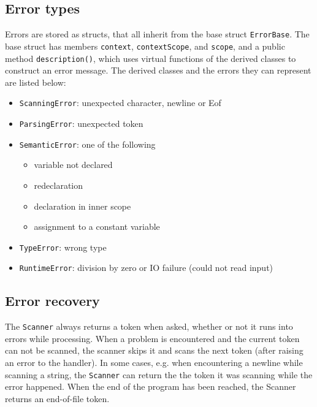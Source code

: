 \documentclass[a4paper]{article}
\newcommand*{\code}[1]{\texttt{#1}}
\begin{document}
\subsection{Error types}

Errors are stored as structs, that all inherit from the 
base struct \code{ErrorBase}. The base struct has members 
\code{context}, \code{contextScope}, and \code{scope}, 
and a public method \code{description()}, which uses 
virtual functions of the derived classes to construct an 
error message. The derived classes and the errors they 
can represent are listed below:
\begin{itemize}
  \item \code{ScanningError}: unexpected character, newline or Eof
  \item \code{ParsingError}: unexpected token
  \item \code{SemanticError}: one of the following
  \begin{itemize}
    \item variable not declared
    \item redeclaration
    \item declaration in inner scope
    \item assignment to a constant variable
  \end{itemize}
  \item \code{TypeError}: wrong type
  \item \code{RuntimeError}: division by zero or IO failure (could not read input)
\end{itemize}


\subsection{Error recovery}

The \code{Scanner} always returns a token when asked, whether or 
not it runs into errors while processing. When a problem is 
encountered and the current token can not be scanned, the scanner 
skips it and scans the next token (after raising an error to the 
handler). In some cases, e.g. when encountering a newline while 
scanning a string, the \code{Scanner} can return the the token it 
was scanning while the error happened. When the end of the 
program has been reached, the Scanner returns an end-of-file token.
\end{document}
